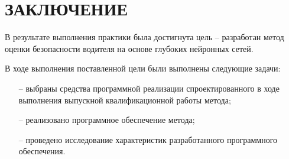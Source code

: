 \section*{ЗАКЛЮЧЕНИЕ}

В результате выполнения практики была достигнута цель -- разработан метод оценки безопасности водителя на основе глубоких нейронных сетей.

В ходе выполнения поставленной цели были выполнены следующие задачи:

\begin{itemize}[leftmargin=1.6\parindent]
	\item[--] выбраны средства программной реализации спроектированного в ходе выполнения
	выпускной квалификационной работы метода;
	\item[--] реализовано программное обеспечение метода;
	\item[--] проведено исследование характеристик разработанного программного обеспечения.
\end{itemize}



\pagebreak
